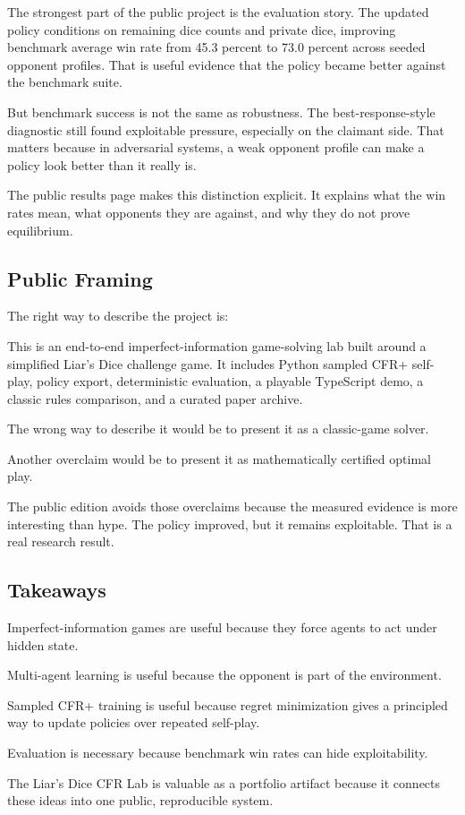 \documentclass[
]{article}
\begin{document}
The strongest part of the public project is the evaluation story. The
updated policy conditions on remaining dice counts and private dice,
improving benchmark average win rate from 45.3 percent to 73.0 percent
across seeded opponent profiles. That is useful evidence that the policy
became better against the benchmark suite.

But benchmark success is not the same as robustness. The
best-response-style diagnostic still found exploitable pressure,
especially on the claimant side. That matters because in adversarial
systems, a weak opponent profile can make a policy look better than it
really is.

The public results page makes this distinction explicit. It explains
what the win rates mean, what opponents they are against, and why they
do not prove equilibrium.

\subsection{Public Framing}\label{public-framing}

The right way to describe the project is:

This is an end-to-end imperfect-information game-solving lab built
around a simplified Liar's Dice challenge game. It includes Python
sampled CFR+ self-play, policy export, deterministic evaluation, a
playable TypeScript demo, a classic rules comparison, and a curated
paper archive.

The wrong way to describe it would be to present it as a classic-game
solver.

Another overclaim would be to present it as mathematically certified
optimal play.

The public edition avoids those overclaims because the measured evidence
is more interesting than hype. The policy improved, but it remains
exploitable. That is a real research result.

\subsection{Takeaways}\label{takeaways}

Imperfect-information games are useful because they force agents to act
under hidden state.

Multi-agent learning is useful because the opponent is part of the
environment.

Sampled CFR+ training is useful because regret minimization gives a
principled way to update policies over repeated self-play.

Evaluation is necessary because benchmark win rates can hide
exploitability.

The Liar's Dice CFR Lab is valuable as a portfolio artifact because it
connects these ideas into one public, reproducible system.
\end{document}
